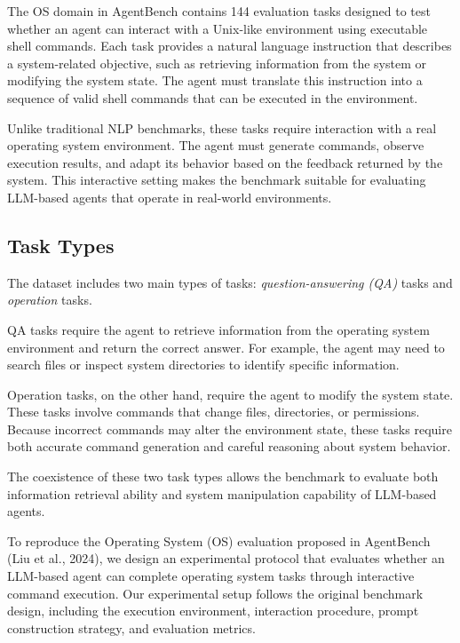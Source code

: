 \documentclass[11pt]{article}
\begin{document}
The OS domain in AgentBench contains 144 evaluation tasks designed to test whether an agent can interact with a Unix-like environment using executable shell commands. Each task provides a natural language instruction that describes a system-related objective, such as retrieving information from the system or modifying the system state. The agent must translate this instruction into a sequence of valid shell commands that can be executed in the environment.

Unlike traditional NLP benchmarks, these tasks require interaction with a real operating system environment. The agent must generate commands, observe execution results, and adapt its behavior based on the feedback returned by the system. This interactive setting makes the benchmark suitable for evaluating LLM-based agents that operate in real-world environments.

\subsection{Task Types}

The dataset includes two main types of tasks: \textit{question-answering (QA)} tasks and \textit{operation} tasks.

QA tasks require the agent to retrieve information from the operating system environment and return the correct answer. For example, the agent may need to search files or inspect system directories to identify specific information.

Operation tasks, on the other hand, require the agent to modify the system state. These tasks involve commands that change files, directories, or permissions. Because incorrect commands may alter the environment state, these tasks require both accurate command generation and careful reasoning about system behavior.

The coexistence of these two task types allows the benchmark to evaluate both information retrieval ability and system manipulation capability of LLM-based agents.




To reproduce the Operating System (OS) evaluation proposed in AgentBench (Liu et al., 2024), we design an experimental protocol that evaluates whether an LLM-based agent can complete operating system tasks through interactive command execution. Our experimental setup follows the original benchmark design, including the execution environment, interaction procedure, prompt construction strategy, and evaluation metrics.
\end{document}
